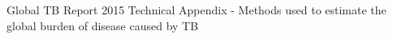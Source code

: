 Global TB Report 2015 Technical Appendix - Methods used to estimate the global burden of disease caused by TB